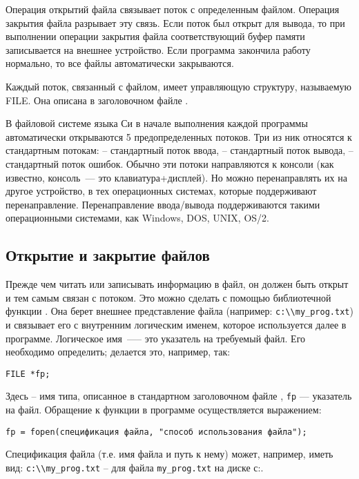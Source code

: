 Операция открытий файла связывает поток с определенным файлом. Операция закрытия файла разрывает эту связь. Если поток был открыт для
вывода, то при выполнении операции закрытия файла соответствующий буфер памяти записывается на внешнее устройство. Если программа закончила
работу нормально, то все файлы автоматически закрываются.

Каждый поток, связанный с файлом, имеет управляющую структуру, называемую FILE. Она описана в заголовочном файле .

В файловой системе языка Си в начале выполнения каждой программы автоматически открываются 5 предопределенных потоков.
Три из ник относятся к стандартным потокам:  – стандартный поток ввода,  – стандартный поток
вывода,  – стандартный поток ошибок. Обычно эти потоки направляются к консоли (как известно, консоль~--- это
клавиатура+дисплей). Но можно перенаправлять их на другое устройство, в тех операционных системах, которые поддерживают
перенаправление. Перенаправление ввода/вывода поддерживаются такими операционными системами, как Windows, DOS, UNIX, OS/2.

\subsection{Открытие и закрытие файлов}
Прежде чем читать или записывать информацию в файл, он должен быть открыт и тем самым связан с потоком. Это можно сделать
с помощью библиотечной функции . Она берет внешнее представление файла (например: \verb|c:\\my_prog.txt|) и связывает его
с внутренним логическим именем, которое используется далее в программе. Логическое имя~---– это указатель на требуемый файл.
Его необходимо определить; делается это, например, так:
\begin{verbatim}
FILE *fp;
\end{verbatim}
Здесь  – имя типа, описанное в стандартном заголовочном файле , \verb|fp| --- указатель на файл.
Обращение к функции  в программе осуществляется выражением:
\begin{verbatim}
fp = fopen(спецификация файла, "способ использования файла");
\end{verbatim}

Спецификация файла (т.е. имя файла и путь к нему) может, например, иметь вид: \verb|c:\\my_prog.txt| – для файла \verb|my_prog.txt| на диске с:.

